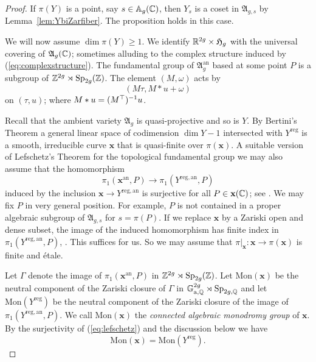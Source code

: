 \documentclass[12pt,oneside]{amsart}
\begin{document}
\begin{proof}
  If $\pi(Y)$ is a point, say $s\in {\mathbb{A}}_g({\mathbb{C}})$, then $Y_s$ is a coset
  in $\mathfrak{A}_{g,s}$ by Lemma~\ref{lem:YbiZarfiber}. The
  proposition holds in this case. 

  We will now assume $\dim\pi(Y)\ge 1$. 
  We identify ${\mathbb{R}}^{2g}\times\mathfrak{H}_g$ with the universal
  covering of $\mathfrak{A}_{g}({\mathbb{C}})$; sometimes alluding to the
  complex structure induced by (\ref{eq:complexstructure}). The
  fundamental group of $\mathfrak{A}_g^{\mathrm{an}}$ based at some
  point $P$  is a
  subgroup of ${\mathbb{Z}}^{2g}\rtimes \mathrm{Sp}_{2g}({\mathbb{Z}})$. The element
  $(M,\omega)$ acts by
  \begin{equation*}
    \left(M\tau, M*u+\omega
    \right)
  \end{equation*}
  on $(\tau,u)$; where $M*u = (M^{\top})^{-1}u$.


  Recall that the  ambient variety $\mathfrak{A}_g$ is
  quasi-projective and so is $Y$. By Bertini's Theorem a general
  linear space of codimension $\dim Y - 1$
  intersected with $Y^{\mathrm{reg}}$ is a smooth, irreducible curve
  $\mathbf{x}$ that is quasi-finite over $\pi(\mathbf{x})$.  
  A suitable version of Lefschetz's Theorem for the topological
  fundamental group we may also assume that
  the homomorphism
  \begin{equation}
    \label{eq:lefschetz}
    \pi_1(\mathbf{x}^{\mathrm{an}},P)\rightarrow \pi_1(Y^{\mathrm{reg,an}},P)
  \end{equation}
  induced by the inclusion $\mathbf{x}\rightarrow Y^{\mathrm{reg,an}}$
  is surjective for all $P\in \mathbf{x}({\mathbb{C}})$; see \cite[Lemme
  1.4]{Deligne:bourbaki81}.
  We may fix  $P$ in very general position. For
  example, $P$ is not contained in a proper algebraic subgroup of
  $\mathfrak{A}_{g,s}$ for $s=\pi(P)$. If we replace $\mathbf{x}$ by a
  Zariski open and dense subset, the image of the induced homomorphism
  has finite index in $\pi_1(Y^{\mathrm{reg,an}},P)$, \cite[Lemme
  4.4.17]{Deligne:Hodge2}. This suffices for us. So we
  may assume that $\pi|_{\mathbf{x}} \colon \mathbf{x}\rightarrow \pi(\mathbf{x})$
  is finite and \'etale.

  
  Let $\Gamma$ denote the image of $\pi_1(\mathbf{x}^{\mathrm{an}},P)$
  in ${\mathbb{Z}}^{2g}\rtimes \mathrm{Sp}_{2g}({\mathbb{Z}})$.
  Let $\mathrm{Mon}(\mathbf{x})$ be the neutral component of the Zariski closure
  of $\Gamma$ in ${\mathbb{G}}_{\mathrm{a},{\mathbb{Q}}}^{2g}\rtimes \mathrm{Sp}_{2g,{\mathbb{Q}}}$
  and let $\mathrm{Mon}(Y^{\mathrm{reg}})$ be the neutral component of
  the Zariski closure of the image of
  $\pi_1(Y^{\mathrm{reg,an}},P)$.  
  We call  $\mathrm{Mon}(\mathbf{x})$ the \emph{connected algebraic monodromy group} of
  $\mathbf{x}$. By the surjectivity of (\ref{eq:lefschetz}) and the
  discussion below we have
  \begin{equation}
    \label{eq:MonxMonY}
    \mathrm{Mon}(\mathbf{x})=\mathrm{Mon}(Y^{\mathrm{reg}}).
  \end{equation}



\end{proof}
\end{document}
